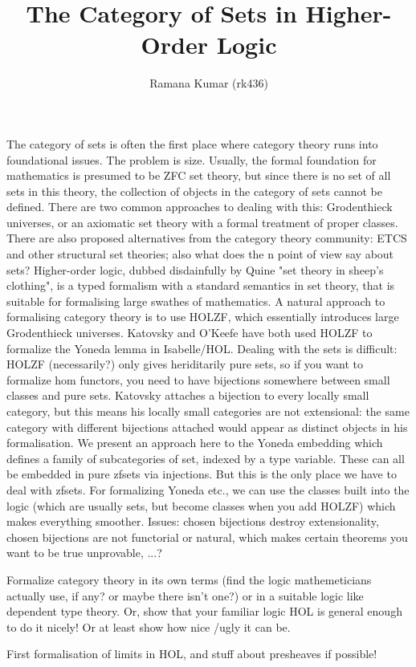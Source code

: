 \documentclass{article}
\title{The Category of Sets in Higher-Order Logic}
\author{Ramana Kumar (rk436)}
\begin{document}
\maketitle

The category of sets is often the first place where category theory runs into foundational issues.
The problem is size.
Usually, the formal foundation for mathematics is presumed to be ZFC set theory, but since there is no set of all sets in this theory, the collection of objects in the category of sets cannot be defined.
There are two common approaches to dealing with this: Grodenthieck universes, or an axiomatic set theory with a formal treatment of proper classes.
There are also proposed alternatives from the category theory community: ETCS and other structural set theories; also what does the n point of view say about sets?
Higher-order logic, dubbed disdainfully by Quine "set theory in sheep's clothing", is a typed formalism with a standard semantics in set theory, that is suitable for formalising large swathes of mathematics.
A natural approach to formalising category theory is to use HOLZF, which essentially introduces large Grodenthieck universes.
Katovsky and O'Keefe have both used HOLZF to formalize the Yoneda lemma in Isabelle/HOL.
Dealing with the sets is difficult: HOLZF (necessarily?) only gives heriditarily pure sets, so if you want to formalize hom functors, you need to have bijections somewhere between small classes and pure sets.
Katovsky attaches a bijection to every locally small category, but this means his locally small categories are not extensional: the same category with different bijections attached would appear as distinct objects in his formalisation.
We present an approach here to the Yoneda embedding which defines a family of subcategories of set, indexed by a type variable.
These can all be embedded in pure zfsets via injections.
But this is the only place we have to deal with zfsets.
For formalizing Yoneda etc., we can use the classes built into the logic (which are usually sets, but become classes when you add HOLZF) which makes everything smoother.
Issues: chosen bijections destroy extensionality, chosen bijections are not functorial or natural, which makes certain theorems you want to be true unprovable, ...?

Formalize category theory in its own terms (find the logic mathemeticians actually use, if any? or maybe there isn't one?) or in a suitable logic like dependent type theory. Or, show that your familiar logic HOL is general enough to do it nicely! Or at least show how nice /ugly it can be.

First formalisation of limits in HOL, and stuff about presheaves if possible!
\end{document}
